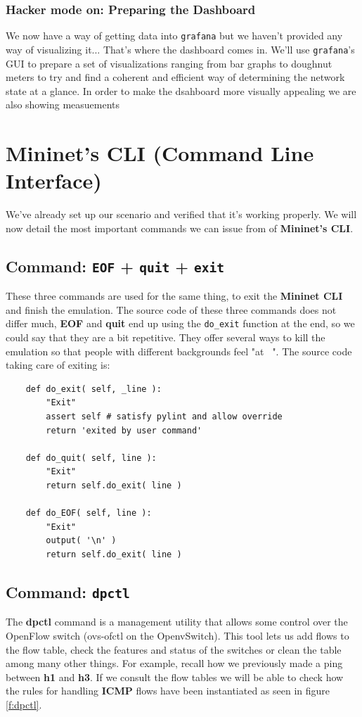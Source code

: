 \documentclass[12pt]{article}
\begin{document}
		\subsubsection{Hacker mode on: Preparing the Dashboard}
			We now have a way of getting data into \texttt{grafana} but we haven't provided any way of visualizing it... That's where the dashboard comes in. We'll use \texttt{grafana}'s GUI to prepare a set of visualizations ranging from bar graphs to doughnut meters to try and find a coherent and efficient way of determining the network state at a glance. In order to make the dsahboard more visually appealing we are also showing measuements %
		

\section{Mininet's CLI (\textbf{C}ommand \textbf{L}ine \textbf{I}nterface)}
	We've already set up our scenario and verified that it's working properly. We will now detail the most important commands we can issue from of \textbf{Mininet's CLI}.

	\subsection{Command: \texttt{EOF} + \texttt{quit} + \texttt{exit}}
		These three commands are used for the same thing, to exit the \textbf{Mininet CLI} and finish the emulation. The source code of these three commands does not differ much, \textbf{EOF} and \textbf{quit} end up using the \texttt{do\_exit} function at the end, so we could say that they are a bit repetitive. They offer several ways to kill the emulation so that people with different backgrounds feel "at \texttt{~}". The source code taking care of exiting is:

		\begin{verbatim}
	def do_exit( self, _line ):
		"Exit"
		assert self # satisfy pylint and allow override
		return 'exited by user command'

	def do_quit( self, line ):
		"Exit"
		return self.do_exit( line )

	def do_EOF( self, line ):
		"Exit"
		output( '\n' )
		return self.do_exit( line )
		\end{verbatim}

	\subsection{Command: \texttt{dpctl}}
		The \textbf{dpctl} command is a management utility that allows some control over the OpenFlow switch (ovs-ofctl on the OpenvSwitch). This tool lets us add flows to the flow table, check the features and status of the switches or clean the table among many other things. For example, recall how we previously made a ping between \textbf{h1} and \textbf{h3}. If we consult the flow tables we will be able to check how the rules for handling \textbf{ICMP} flows have been instantiated as seen in figure \ref{f:dpctl}.
\end{document}

